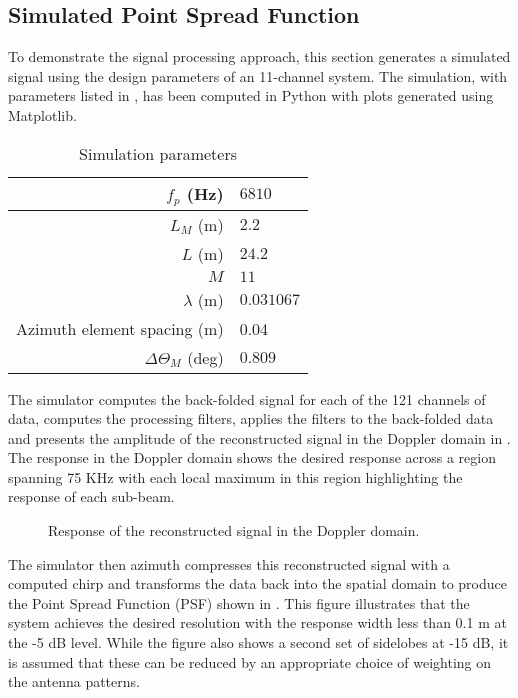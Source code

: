 \documentclass[journal]{IEEEtran}
\newcommand{\antennaLength}{\ensuremath{L}}
\newcommand{\antennaLengthEffective}{\ensuremath{L_M}}
\newcommand{\wavelength}{\ensuremath{\lambda}}
\newcommand{\threeDBEffective}{\ensuremath{\Theta_{M}}}
\newcommand{\prf}{\ensuremath{f_p}}
\begin{document}
\subsection{Simulated Point Spread Function}
To demonstrate the signal processing approach, this section generates a simulated signal using the design parameters of an 11-channel system. The simulation, with parameters listed in , has been computed in Python with plots generated using Matplotlib.
\begin{table}[h!]
\begin{center}
 \caption{Simulation parameters}
 \label{tb:simulation}
 \begin{tabular}{r|l}
  $\prf$ (Hz) & $6810$\\\hline
  $\antennaLengthEffective$ (m) & $2.2$\\\hline
  $\antennaLength$ (m) & $24.2$\\\hline
  $M$ & $11$\\\hline
  $\wavelength$ (m) & $0.031067$\\\hline
  Azimuth element spacing (m) & 0.04\\\hline
  $\Delta\threeDBEffective$ (deg) & $0.809$
 \end{tabular}
 \end{center}
\end{table}
The simulator computes the back-folded signal for each of the 121 channels of data, computes the processing filters, applies the filters to the back-folded data and presents the amplitude of the reconstructed signal in the Doppler domain in . The response in the Doppler domain shows the desired response across a region spanning 75 KHz with each local maximum in this region highlighting the response of each sub-beam.
\begin{figure}[h!]
\begin{center}
 \resizebox{\columnwidth}{!}{}
 \caption{Response of the reconstructed signal in the Doppler domain.}
 \label{fg:reconstructed}
 \end{center}
\end{figure}
The simulator then azimuth compresses this reconstructed signal with a computed chirp and transforms the data back into the spatial domain to produce the Point Spread Function (PSF) shown in . This figure illustrates that the system achieves the desired resolution with the response width less than 0.1 m at the -5 dB level. While the figure also shows a second set of sidelobes at -15 dB, it is assumed that these can be reduced by an appropriate choice of weighting on the antenna patterns. 
\end{document}
